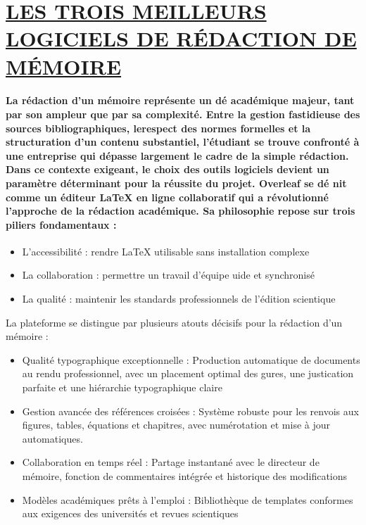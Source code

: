 \documentclass{article}
\begin{document}
\section{ \underline{LES TROIS MEILLEURS LOGICIELS DE RÉDACTION DE MÉMOIRE}}

 \paragraph{La rédaction d'un mémoire représente un dé académique majeur, tant par son ampleur que par sa complexité.  Entre la gestion fastidieuse des sources bibliographiques, lerespect des normes formelles et la structuration d'un contenu substantiel, l'étudiant se trouve confronté à une entreprise qui dépasse largement le cadre de la simple rédaction.  Dans ce contexte exigeant, le choix des outils logiciels devient un paramètre déterminant pour la réussite du projet.  Overleaf se dé nit comme un éditeur LaTeX en ligne collaboratif qui a révolutionné
 l'approche de la rédaction académique. Sa philosophie repose sur trois piliers fondamentaux :}
\begin{itemize}

\item  L'accessibilité : rendre LaTeX utilisable sans installation complexe
\item  La collaboration : permettre un travail d'équipe uide et synchronisé
\item  La qualité : maintenir les standards professionnels de l'édition scientique


\end{itemize}

La plateforme se distingue par plusieurs atouts décisifs pour la rédaction d'un mémoire :
\begin{itemize}

\item  Qualité typographique exceptionnelle : Production automatique de documents au rendu professionnel, avec un placement optimal des gures, une justication parfaite et une hiérarchie typographique claire

\item   Gestion avancée des références croisées : Système robuste pour les renvois aux figures, tables, équations et chapitres, avec numérotation et mise à jour automatiques.

\item  Collaboration en temps réel : Partage instantané avec le directeur de mémoire, fonction de commentaires intégrée et historique des modifications

\item   Modèles académiques prêts à l'emploi : Bibliothèque de templates conformes aux exigences des universités et revues scientiques

\end{itemize}
\end{document}
